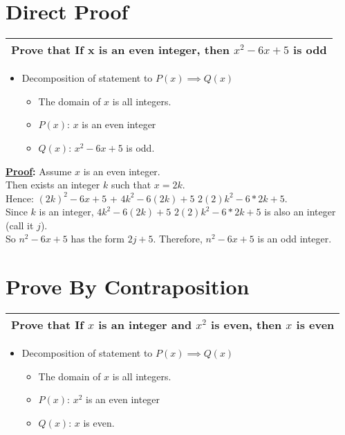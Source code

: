 \documentclass[a4paper]{article}
\begin{document}
\section{Direct Proof}
\boldmath
\begin{tabularx}{1.0\textwidth}{|X|}
\hline
Prove that \textbf{If x is an even integer, then $x^2 - 6x + 5$ is odd} \\
\hline
\end{tabularx}
\unboldmath
\begin{itemize}
    \item Decomposition of statement to $P(x) \implies Q(x)$
    \begin{itemize}
        \item The domain of $x$ is all integers.
        \item $P(x)$: $x$ is an even integer
        \item $Q(x)$: $x^2 - 6x + 5$ is odd.
    \end{itemize}
\end{itemize}
\smallskip

\textbf{\underline{Proof}:} Assume $x$ is an even integer. \\
Then exists an integer $k$ such that $x = 2k$.  \\
Hence: $(2k)^2 - 6x + 5$ + $4k^2 - 6(2k) + 5$ $2(2)k^2 - 6 * 2k + 5$. \\
Since $k$ is an integer, $4k^2 - 6(2k) + 5$ $2(2)k^2 - 6 * 2k + 5$ is also an integer (call it $j$). \\
So $n^2 - 6x + 5$ has the form $2j + 5$.
Therefore, $n^2 -6x + 5$ is an odd integer. 

\bigskip %

\section{Prove By Contraposition}
\boldmath
\begin{tabularx}{1.0\textwidth}{|X|}
\hline
Prove that \textbf{If $x$ is an integer and $x^2$ is even, then $x$ is even} \\
\hline
\end{tabularx}
\unboldmath
\begin{itemize}
    \item Decomposition of statement to $P(x) \implies Q(x)$
    \begin{itemize}
        \item The domain of $x$ is all integers.
        \item $P(x)$: $x^2$ is an even integer
        \item $Q(x)$: $x$ is even.
    \end{itemize}
\end{itemize}
\end{document}
